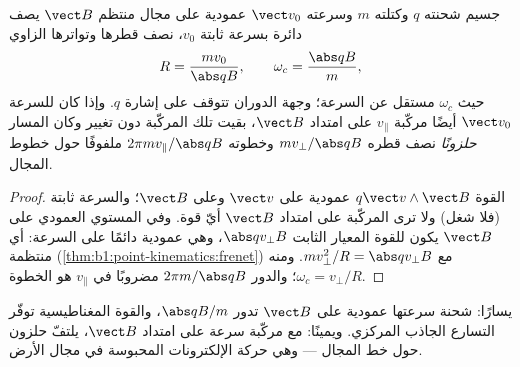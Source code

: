\begin{theorem}\label{thm:b1:charged-particles:bfield}
جسيم شحنته $q$ وكتلته $m$ وسرعته $\vect v_0$ عمودية على
مجال منتظم $\vect B$ يصف دائرة بسرعة ثابتة $v_0$، نصف قطرها
وتواترها الزاوي
\[
R = \frac{mv_0}{\abs q B}, \qquad \omega_c = \frac{\abs q B}{m},
\]
حيث \emph{} $\omega_c$ مستقل عن السرعة؛
وجهة الدوران تتوقف على إشارة $q$. وإذا كان للسرعة $\vect v_0$ أيضًا
مركّبة $v_\parallel$ على امتداد $\vect B$، بقيت تلك المركّبة دون تغيير وكان
المسار \emph{حلزونًا} نصف قطره $mv_\perp/\abs qB$ وخطوته
$2\pi mv_\parallel/\abs qB$ ملفوفًا حول خطوط المجال.
\end{theorem}

\begin{proof}
القوة $q\vect v\wedge\vect B$ عمودية على $\vect v$ وعلى $\vect B$؛
والسرعة ثابتة (فلا شغل) ولا ترى المركّبة على امتداد $\vect B$ أيّ
قوة. وفي المستوي العمودي على $\vect B$ يكون للقوة المعيار
الثابت $\abs qv_\perp B$، وهي عمودية دائمًا على السرعة: أي 
منتظمة (\cref{thm:b1:point-kinematics:frenet}) مع $mv_\perp^2/R =
\abs qv_\perp B$. ومنه $\omega_c = v_\perp/R$؛ والدور $2\pi m/\abs qB$ مضروبًا في
$v_\parallel$ هو الخطوة.
\end{proof}

\begin{omfigure}

{\small يسارًا: شحنة سرعتها عمودية على $\vect B$
تدور  $\abs qB/m$، والقوة المغناطيسية
توفّر التسارع الجاذب المركزي. ويمينًا: مع مركّبة سرعة
على امتداد $\vect B$، يلتفّ حلزون حول خط المجال ---
وهي حركة الإلكترونات المحبوسة في مجال الأرض.}
\end{omfigure}

